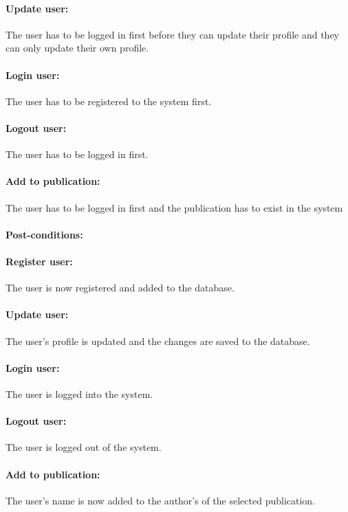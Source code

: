 \documentclass{article}
\begin{document}
				\paragraph{Update user:} The user has to be logged in first before they can update their profile and they can only update their own profile.
				\paragraph{Login user:} The user has to be registered to the system first.
				\paragraph{Logout user:} The user has to be logged in first.
				\paragraph{Add to publication:} The user has to be logged in first and the publication has to exist in the system
				\paragraph{Post-conditions:}
				\paragraph{Register user:} The user is now registered and added to the database.
				\paragraph{Update user:} The user's profile is updated and the changes are saved to the database.
				\paragraph{Login user:} The user is logged into the system.
				\paragraph{Logout user:} The user is logged out of the system.
				\paragraph{Add to publication:} The user's name is now added to the author's of the selected publication.
\end{document}
